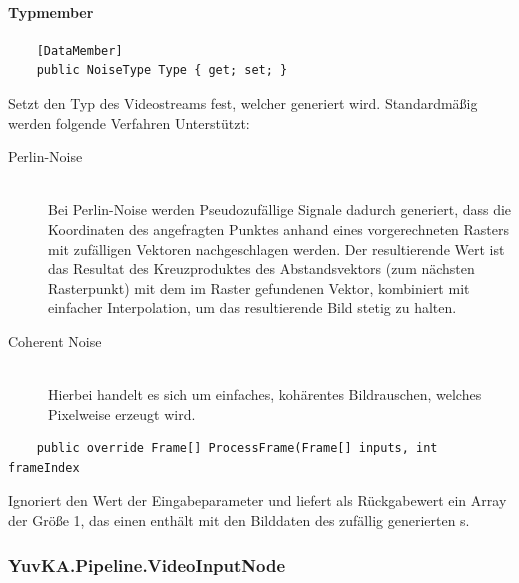 \paragraph{Typmember}
\begin{itemize}

	\begin{verbatim}
	[DataMember]
	public NoiseType Type { get; set; }
	\end{verbatim}
	Setzt den Typ des Videostreams fest, welcher generiert wird. Standardmäßig werden folgende Verfahren Unterstützt:
	\begin{description}
		\item[Perlin-Noise]~\\
		Bei Perlin-Noise werden Pseudozufällige Signale dadurch generiert, dass die Koordinaten des angefragten Punktes anhand eines vorgerechneten Rasters mit zufälligen Vektoren nachgeschlagen werden. Der resultierende Wert ist das Resultat des Kreuzproduktes des Abstandsvektors (zum nächsten Rasterpunkt) mit dem im Raster gefundenen Vektor, kombiniert mit einfacher Interpolation, um das resultierende Bild stetig zu halten.
		\item[Coherent Noise]~\\
		Hierbei handelt es sich um einfaches, kohärentes Bildrauschen, welches Pixelweise erzeugt wird.
	\end{description}

	\begin{verbatim}
	public override Frame[] ProcessFrame(Frame[] inputs, int frameIndex
	\end{verbatim}
	Ignoriert den Wert der Eingabeparameter und liefert als Rückgabewert ein Array der Größe 1, das einen  enthält mit den Bilddaten des zufällig generierten s.


\end{itemize}

\subsubsection{YuvKA.Pipeline.VideoInputNode}
